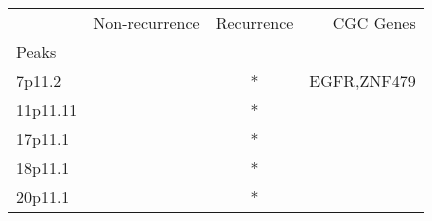 \begin{tabular}{lccr}
\toprule
{} & Non-recurrence & Recurrence &    CGC Genes \\
Peaks    &                &            &              \\
\midrule
7p11.2   &                &          * &  EGFR,ZNF479 \\
11p11.11 &                &          * &              \\
17p11.1  &                &          * &              \\
18p11.1  &                &          * &              \\
20p11.1  &                &          * &              \\
\bottomrule
\end{tabular}
